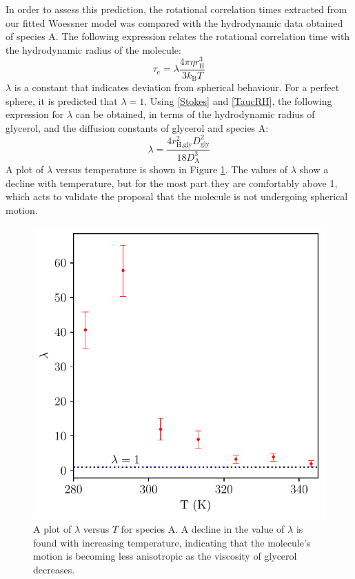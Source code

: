 In order to assess this prediction, the rotational correlation times extracted from our fitted Woessner model was compared with the hydrodynamic data obtained of species A. The following expression relates the rotational correlation time with the hydrodynamic radius of the molecule\cite{RN56}:
\begin{equation}
\label{TaucRH}
\tau_{\text{c}} = \lambda\frac{4 \pi \eta r_{\text{H}}^3}{3k_{\text{B}}T}
\end{equation}
$\lambda$ is a constant that indicates deviation from spherical behaviour. For a perfect sphere, it is predicted that $\lambda = 1$. Using \ref{Stokes} and \ref{TaucRH}, the following expression for $\lambda$ can be obtained, in terms of the hydrodynamic radius of glycerol, and the diffusion constants of glycerol and species A:
\begin{equation}
\lambda = \frac{4 r_{\text{H,gly}}^2 D_{\text{gly}}^2}{18D_{\text{A}}^3}
\end{equation}
A plot of $\lambda$ versus temperature is shown in Figure \ref{Lambda}. The values of $\lambda$ show a decline with temperature, but for the most part they are comfortably above 1, which acts to validate the proposal that the molecule is not undergoing spherical motion.
\begin{figure}
\centering
\includegraphics[scale=0.7]{./Figures/SimonsFigs/Lambda.pdf}
\caption{A plot of $\lambda$ versus $T$ for species A. A decline in the value of $\lambda$ is found with increasing temperature, indicating that the molecule's motion is becoming less anisotropic as the viscosity of glycerol decreases.}
\label{Lambda}
\end{figure}
